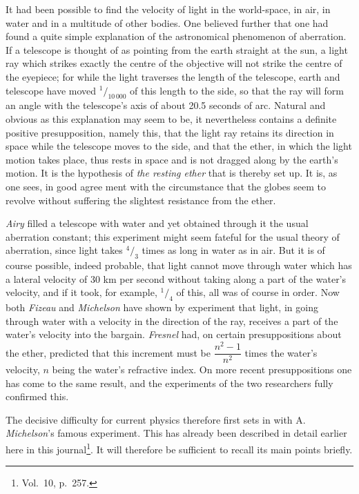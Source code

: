 \documentclass[12pt,a4paper]{article}
\begin{document}
It had been possible to find the velocity of light in the world-space, in air,
in water and in a multitude of other bodies. One believed further that one had
found a quite simple explanation of the astronomical phenomenon of aberration.
If a telescope is thought of as pointing from the earth straight at the sun, a
light ray which strikes exactly the centre of the objective will not strike
the centre of the eyepiece; for while the light traverses the length of the
telescope, earth and telescope have moved $^{1}\!/_{10\,000}$ of this
length to the side, so that the ray will form an angle with the telescope's
axis of about 20.5 seconds of arc. Natural and obvious as this explanation may
seem to be, it nevertheless contains a definite positive presupposition,
namely this, that the light ray retains its direction in space while the
telescope moves to the side, and that the ether, in which the light motion
takes place, thus rests in space and is not dragged along by the earth's
motion. It is the hypothesis of \emph{the resting ether} that is thereby set
up. It is, as one sees, in good agree\-%
ment with the circumstance that the globes seem to revolve without suffering
the slightest resistance from the ether.

\emph{Airy} filled a telescope with water and yet obtained through it the
usual aberration constant; this experiment might seem fateful for the usual
theory of aberration, since light takes $^{4}\!/_{3}$ times as long in water
as in air. But it is of course possible, indeed probable, that light cannot
move through water which has a lateral velocity of 30 km per second without
taking along a part of the water's velocity, and if it took, for example,
$^{1}\!/_{4}$ of this, all was of course in order. Now both \emph{Fizeau} and
\emph{Michelson} have shown by experiment that light, in going through water
with a velocity in the direction of the ray, receives a part of the water's
velocity into the bargain. \emph{Fresnel} had, on certain presuppositions
about the ether, predicted that this increment must be
$\dfrac{n^{2}-1}{n^{2}}$ times the water's velocity, $n$ being the water's
refractive index. On more recent presuppositions one has come to the same
result, and the experiments of the two researchers fully confirmed this.

The decisive difficulty for current physics therefore first sets in with
A. \emph{Michelson}'s famous experiment. This has already been described in
detail earlier here in this journal\footnote{Vol.\ 10, p.\ 257.}. It will
therefore be sufficient to recall its main points briefly.
\end{document}
